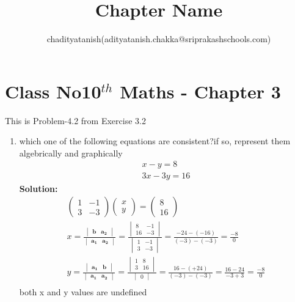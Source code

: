 \documentclass[12pt]{article}
\title{Chapter Name}
\author{chadityatanish(adityatanish.chakka@sriprakashschools.com)}
\newcommand{\myvec}[1]{\ensuremath{\begin{pmatrix}#1\end{pmatrix}}}
\newcommand{\mydet}[1]{\ensuremath{\begin{vmatrix}#1\end{vmatrix}}}
\newcommand{\solution}{\noindent \textbf{Solution: }}
\let\vec\mathbf
\begin{document}
\maketitle
\section*{Class No10$^{th}$ Maths - Chapter 3}
This is Problem-4.2 from Exercise 3.2
\begin{enumerate}
\item which one of the following equations are consistent?if so, represent them algebrically and graphically
\begin{align}
x-y=8\\
3x-3y=16 
\end{align}
\solution\\
\begin{align}
\myvec{1&-1\\3&-3}\myvec{x\\y} = \myvec{8\\16}\\
x=\frac{\mydet{\vec{b} & \vec{a_2}}}{\mydet{ \vec{a_1} &\vec{a_2} }}=
\frac{\mydet{8 & -1 \\ 16 & -3}}{\mydet{1&-1 \\ 3&-3}}=
\frac{-24 - (-16)}{(-3) - (-3)}=\frac{-8}{0} \\
y=\frac{\mydet{  \vec{a_1} & \vec{b}}}{\mydet{ \vec{a_1} &\vec{a_2} }}=
\frac{\mydet{1 & 8\\ 3 & 16}}{\mydet{0}}= 
\frac{16 - (+24)}{(-3) - (-3)}=
\frac{16-24}{-3+3} = \frac{-8}{0} \\
\end{align}
both x and y values are undefined
\end{enumerate}
\end{document}
